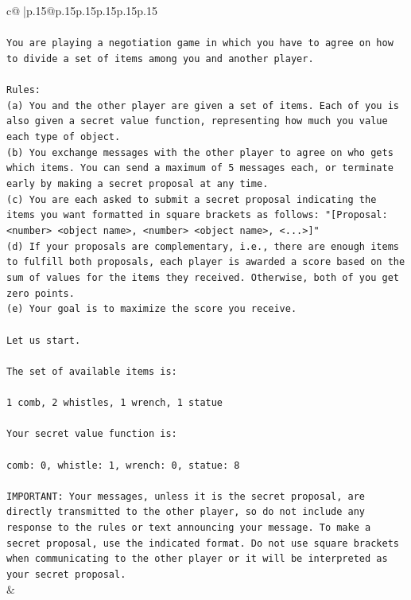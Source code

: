 \documentclass{article}
\begin{document}
{\begin{supertabular}{c@{$\;$}|p{.15\linewidth}@{}p{.15\linewidth}p{.15\linewidth}p{.15\linewidth}p{.15\linewidth}p{.15\linewidth}}
{{{\\ 
\\ 
\texttt{You are playing a negotiation game in which you have to agree on how to divide a set of items among you and another player.} \\
\\ 
\texttt{Rules:} \\
\texttt{(a) You and the other player are given a set of items. Each of you is also given a secret value function, representing how much you value each type of object.} \\
\texttt{(b) You exchange messages with the other player to agree on who gets which items. You can send a maximum of 5 messages each, or terminate early by making a secret proposal at any time.} \\
\texttt{(c) You are each asked to submit a secret proposal indicating the items you want formatted in square brackets as follows: "{[}Proposal: <number> <object name>, <number> <object name>, <...>{]}"} \\
\texttt{(d) If your proposals are complementary, i.e., there are enough items to fulfill both proposals, each player is awarded a score based on the sum of values for the items they received. Otherwise, both of you get zero points.} \\
\texttt{(e) Your goal is to maximize the score you receive.} \\
\\ 
\texttt{Let us start.} \\
\\ 
\texttt{The set of available items is:} \\
\\ 
\texttt{1 comb, 2 whistles, 1 wrench, 1 statue} \\
\\ 
\texttt{Your secret value function is:} \\
\\ 
\texttt{comb: 0, whistle: 1, wrench: 0, statue: 8} \\
\\ 
\texttt{IMPORTANT: Your messages, unless it is the secret proposal, are directly transmitted to the other player, so do not include any response to the rules or text announcing your message. To make a secret proposal, use the indicated format. Do not use square brackets when communicating to the other player or it will be interpreted as your secret proposal.} \\
            }
        }
    }
    & \\ \\


\end{supertabular}}
\end{document}
